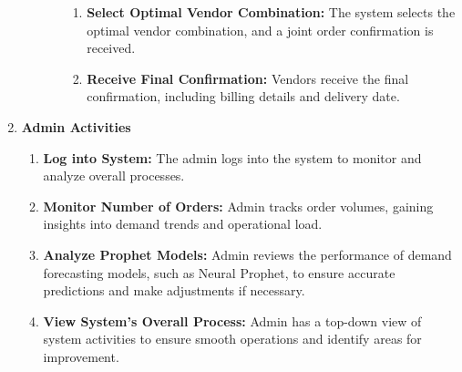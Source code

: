 \begin{enumerate}
\begin{enumerate}
\begin{itemize}
\begin{enumerate}
                                  \item \textbf{Select Optimal Vendor Combination:} The system selects the optimal vendor combination, and a joint order confirmation is received.
                                  \item \textbf{Receive Final Confirmation:} Vendors receive the final confirmation, including billing details and delivery date.
                              \end{enumerate}
                    \end{itemize}
          \end{enumerate}

    \item \textbf{Admin Activities}
          \begin{enumerate}
              \item \textbf{Log into System:} The admin logs into the system to monitor and analyze overall processes.
              \item \textbf{Monitor Number of Orders:} Admin tracks order volumes, gaining insights into demand trends and operational load.
              \item \textbf{Analyze Prophet Models:} Admin reviews the performance of demand forecasting models, such as Neural Prophet, to ensure accurate predictions and make adjustments if necessary.
              \item \textbf{View System's Overall Process:} Admin has a top-down view of system activities to ensure smooth operations and identify areas for improvement.
          \end{enumerate}
\end{enumerate}


